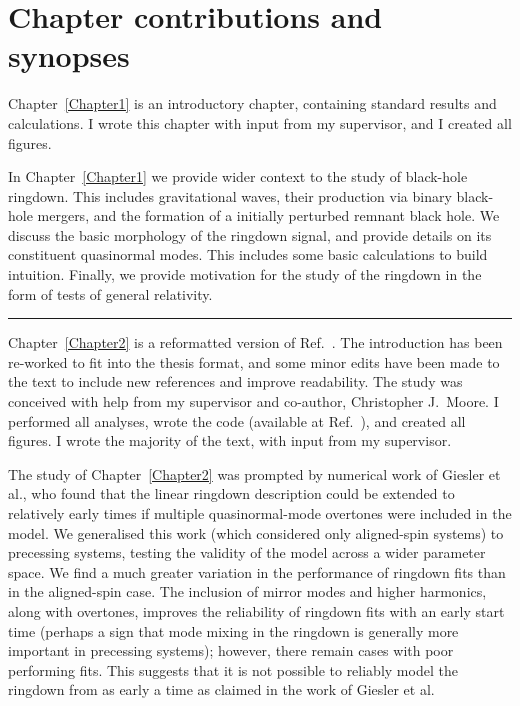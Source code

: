 \documentclass[
12pt, %
english, %
doublespacing, %
headsepline, %
]{MastersDoctoralThesis} %
\begin{document}
\section*{Chapter contributions and synopses}

Chapter~\ref{Chapter1} is an introductory chapter, containing standard results and calculations. 
I wrote this chapter with input from my supervisor, and I created all figures. 

\vspace{0.2cm}

\noindent In Chapter~\ref{Chapter1} we provide wider context to the study of black-hole ringdown.
This includes gravitational waves, their production via binary black-hole mergers, and the formation of a initially perturbed remnant black hole.
We discuss the basic morphology of the ringdown signal, and provide details on its constituent quasinormal modes. 
This includes some basic calculations to build intuition.
Finally, we provide motivation for the study of the ringdown in the form of tests of general relativity. 

\begin{center}
    \rule[.5ex]{.5\textwidth}{.5pt}
\end{center}

\noindent Chapter~\ref{Chapter2} is a reformatted version of Ref.~\cite{Finch:2021iip}.
The introduction has been re-worked to fit into the thesis format, and some minor edits have been made to the text to include new references and improve readability. 
The study was conceived with help from my supervisor and co-author, Christopher J.\ Moore.
I performed all analyses, wrote the code (available at Ref.~\cite{qnmfits}), and created all figures.
I wrote the majority of the text, with input from my supervisor.

\vspace{0.2cm}

\noindent The study of Chapter~\ref{Chapter2} was prompted by numerical work of Giesler et al., who found that the linear ringdown description could be extended to relatively early times if multiple quasinormal-mode overtones were included in the model.
We generalised this work (which considered only aligned-spin systems) to precessing systems, testing the validity of the model across a wider parameter space.
We find a much greater variation in the performance of ringdown fits than in the aligned-spin case. 
The inclusion of mirror modes and higher harmonics, along with overtones, improves the reliability of ringdown fits with an early start time (perhaps a sign that mode mixing in the ringdown is generally more important in precessing systems); however, there remain cases with poor performing fits.
This suggests that it is not possible to reliably model the ringdown from as early a time as claimed in the work of Giesler et al.
\end{document}
